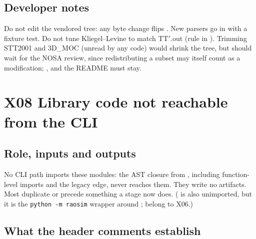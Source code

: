 \subsection{Developer notes}

Do not edit the vendored tree: any byte change flips . New parsers go in  with a fixture test. Do not tune Kliegel--Levine to match TT$'$.out (rule in ). Trimming STT2001 and 3D\_MOC (unread by any code) would shrink the tree, but should wait for the NOSA review, since redistributing a subset may itself count as a modification; ,  and the README must stay.

\section{X08 Library code not reachable from the CLI}\label{sec:x08-unreachable}

\subsection{Role, inputs and outputs}

No CLI path imports these modules: the AST closure from , including function-level imports and the legacy  edge, never reaches them. They write no artifacts. Most duplicate or precede something a stage now does. ( is also unimported, but it is the \texttt{python -m raosim} wrapper around ;  belong to X06.)

\subsection{What the header comments establish}

